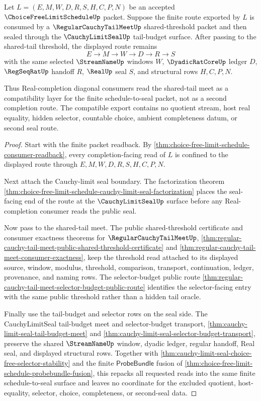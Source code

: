 \begin{theorem}
\label{thm:choice-free-limit-schedule-shared-tail-meet-compatibility}
Let $L=(E,M,W,D,R,S,H,C,P,N)$ be an accepted $\ChoiceFreeLimitScheduleUp$ packet. Suppose the finite route exported by $L$ is consumed by a $\RegularCauchyTailMeetUp$ shared-threshold packet and then sealed through the $\CauchyLimitSealUp$ tail-budget surface. After passing to the shared-tail threshold, the displayed route remains
$$
E \to M \to W \to D \to R \to S
$$
with the same selected $\StreamNameUp$ windows $W$, $\DyadicRatCoreUp$ ledger $D$, $\RegSeqRatUp$ handoff $R$, $\RealUp$ seal $S$, and structural rows $H,C,P,N$.

Thus Real-completion diagonal consumers read the shared-tail meet as a compatibility layer for the finite schedule-to-seal packet, not as a second completion route. The compatible export contains no quotient stream, host real equality, hidden selector, countable choice, ambient completeness datum, or second seal route.
\end{theorem}
\begin{proof}
Start with the finite packet readback. By \autoref{thm:choice-free-limit-schedule-consumer-readback}, every completion-facing read of $L$ is confined to the displayed route through $E,M,W,D,R,S,H,C,P,N$.

Next attach the Cauchy-limit seal boundary. The factorization theorem \autoref{thm:choice-free-limit-schedule-cauchy-limit-seal-factorization} places the seal-facing end of the route at the $\CauchyLimitSealUp$ surface before any Real-completion consumer reads the public seal.

Now pass to the shared-tail meet. The public shared-threshold certificate and consumer exactness theorems for $\RegularCauchyTailMeetUp$, \autoref{thm:regular-cauchy-tail-meet-public-shared-threshold-certificate} and \autoref{thm:regular-cauchy-tail-meet-consumer-exactness}, keep the threshold read attached to its displayed source, window, modulus, threshold, comparison, transport, continuation, ledger, provenance, and naming rows. The selector-budget public route \autoref{thm:regular-cauchy-tail-meet-selector-budget-public-route} identifies the selector-facing entry with the same public threshold rather than a hidden tail oracle.

Finally use the tail-budget and selector rows on the seal side. The CauchyLimitSeal tail-budget meet and selector-budget transport, \autoref{thm:cauchy-limit-seal-tail-budget-meet} and \autoref{thm:cauchy-limit-seal-selector-budget-transport}, preserve the shared $\StreamNameUp$ window, dyadic ledger, regular handoff, Real seal, and displayed structural rows. Together with \autoref{thm:cauchy-limit-seal-choice-free-selector-stability} and the finite $\mathsf{ProbeBundle}$ fusion of \autoref{thm:choice-free-limit-schedule-probebundle-fusion}, this repacks all requested reads into the same finite schedule-to-seal surface and leaves no coordinate for the excluded quotient, host-equality, selector, choice, completeness, or second-seal data.
\end{proof}

